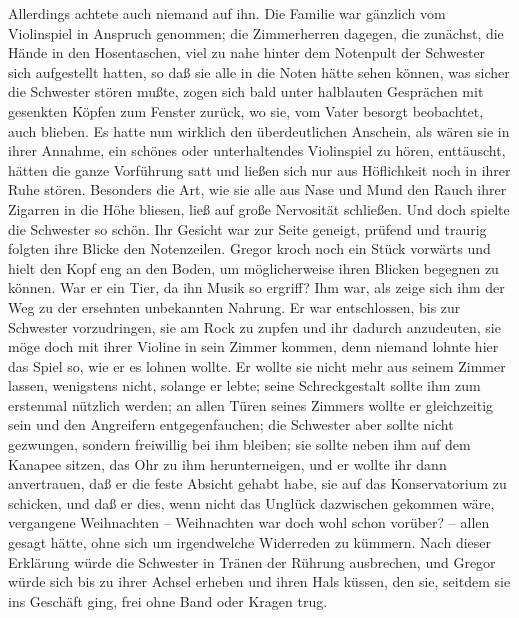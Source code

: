 Allerdings achtete auch niemand auf ihn. Die Familie war gänzlich vom
Violinspiel in Anspruch genommen; die Zimmerherren dagegen, die
zunächst, die Hände in den Hosentaschen, viel zu nahe hinter dem
Notenpult der Schwester sich aufgestellt hatten, so daß sie alle in die
Noten hätte sehen können, was sicher die Schwester stören mußte, zogen
sich bald unter halblauten Gesprächen mit gesenkten Köpfen zum Fenster
zurück, wo sie, vom Vater besorgt beobachtet, auch blieben. Es hatte nun
wirklich den überdeutlichen Anschein, als wären sie in ihrer Annahme,
ein schönes oder unterhaltendes Violinspiel zu hören, enttäuscht, hätten
die ganze Vorführung satt und ließen sich nur aus Höflichkeit noch in
ihrer Ruhe stören. Besonders die Art, wie sie alle aus Nase und Mund den
Rauch ihrer Zigarren in die Höhe bliesen, ließ auf große Nervosität
schließen. Und doch spielte die Schwester so schön. Ihr Gesicht war zur
Seite geneigt, prüfend und traurig folgten ihre Blicke den Notenzeilen.
Gregor kroch noch ein Stück vorwärts und hielt den Kopf eng an den
Boden, um möglicherweise ihren Blicken begegnen zu können. War er ein
Tier, da ihn Musik so ergriff? Ihm war, als zeige sich ihm der Weg zu
der ersehnten unbekannten Nahrung. Er war entschlossen, bis zur
Schwester vorzudringen, sie am Rock zu zupfen und ihr dadurch
anzudeuten, sie möge doch mit ihrer Violine in sein Zimmer kommen, denn
niemand lohnte hier das Spiel so, wie er es lohnen wollte. Er wollte sie
nicht mehr aus seinem Zimmer lassen, wenigstens nicht, solange er lebte;
seine Schreckgestalt sollte ihm zum erstenmal nützlich werden; an allen
Türen seines Zimmers wollte er gleichzeitig sein und den Angreifern
entgegenfauchen; die Schwester aber sollte nicht gezwungen, sondern
freiwillig bei ihm bleiben; sie sollte neben ihm auf dem Kanapee sitzen,
das Ohr zu ihm herunterneigen, und er wollte ihr dann anvertrauen, daß
er die feste Absicht gehabt habe, sie auf das Konservatorium zu
schicken, und daß er dies, wenn nicht das Unglück dazwischen gekommen
wäre, vergangene Weihnachten -- Weihnachten war doch wohl schon vorüber?
-- allen gesagt hätte, ohne sich um irgendwelche Widerreden zu kümmern.
Nach dieser Erklärung würde die Schwester in Tränen der Rührung
ausbrechen, und Gregor würde sich bis zu ihrer Achsel erheben und ihren
Hals küssen, den sie, seitdem sie ins Geschäft ging, frei ohne Band oder
Kragen trug.

